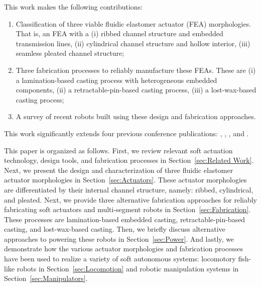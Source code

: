 This work makes the following contributions:
\begin{enumerate}
 \item Classification of three viable fluidic elastomer actuator (FEA) morphologies. That is, an FEA with a (i) ribbed channel structure and embedded transmission lines, (ii) cylindrical channel structure and hollow interior, (iii) seamless pleated channel structure;
 \item Three fabrication processes to reliably manufacture these FEAs. These are (i) a lamination-based casting process with heterogeneous embedded components, (ii) a retractable-pin-based casting process, (iii) a lost-wax-based casting process;
 \item A survey of recent robots built using these design and fabrication approaches.
\end{enumerate}
This work significantly extends four previous conference publications: \citep{marchese2014design}, \cite{katzschmann2014hydraulic}, \citep{marchese2014whole}, and \citep{katzschmann2015autonomous}.

This paper is organized as follows.
First, we review relevant soft actuation technology, design tools, and fabrication processes in Section~\ref{sec:Related Work}.
%
Next, we present the design and characterization of three fluidic elastomer actuator morphologies in Section~\ref{sec:Actuators}.
%
These actuator morphologies are differentiated by their internal channel structure, namely: ribbed, cylindrical, and pleated.
%
Next, we provide three alternative fabrication approaches for reliably fabricating soft actuators and multi-segment robots in Section~\ref{sec:Fabrication}.
%
These processes are lamination-based embedded casting, retractable-pin-based casting, and lost-wax-based casting.
%
Then, we briefly discuss alternative approaches to powering these robots in Section~\ref{sec:Power}.
%
And lastly, we demonstrate how the various actuator morphologies and fabrication processes have been used to realize a variety of soft autonomous systems: locomotory fish-like robots in Section~\ref{sec:Locomotion} and robotic manipulation systems in Section~\ref{sec:Manipulators}. 